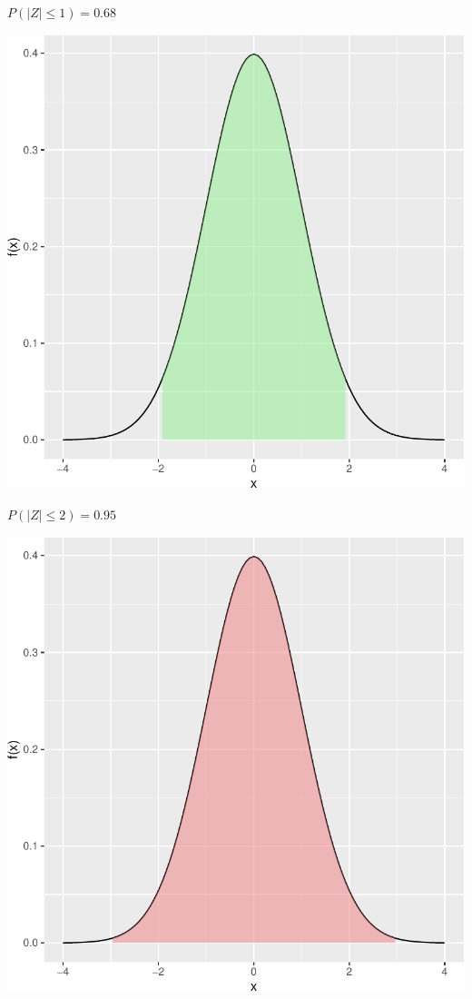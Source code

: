 \documentclass[
  letterpaper,
  DIV=11,
  numbers=noendperiod]{scrartcl}
\begin{document}
{\(P( |Z| \leq 1) = 0.68\)}

\includegraphics[width=1.1\linewidth,height=\textheight,keepaspectratio]{chapter3normal_files/figure-pdf/normalEmpRuleGeneral2-1.pdf}

{\(P( |Z| \leq 2) = 0.95\)}

\includegraphics[width=1.1\linewidth,height=\textheight,keepaspectratio]{chapter3normal_files/figure-pdf/normalEmpRuleGeneral3-1.pdf}
\end{document}
